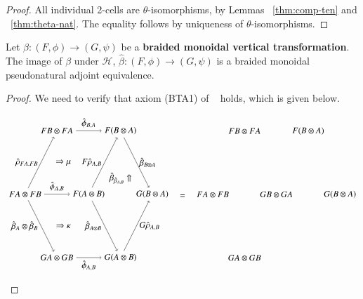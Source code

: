 \begin{proof}
All individual 2-cells are $\theta$-isomorphisms, by Lemmas ~\ref{thm:comp-ten} and ~\ref{thm:theta-nat}. The equality follows by uniqueness of $\theta$-isomorphisms.
\end{proof}

\begin{lem}\label{lem:brtran}
Let $\beta: (F, \phi) \rightarrow (G,\psi)$ be a {\bf braided monoidal vertical transformation}. The image of $\beta$ under $\mathcal{H}$, $\hat{\beta}: (F, \phi) \rightarrow (G,\psi)$ is a braided monoidal pseudonatural adjoint equivalence.
\end{lem}

\begin{proof}
We need to verify that axiom (BTA1) of ~\cite{mccrudden:bal-coalgb} holds, which is given below.

\begin{equation}
\begin{aligned}
\begin{tikzpicture}[scale=1.3]
\node (tl) at (1,4) {$FB \otimes FA$};
\node (tr) at (3,4) {$F(B \otimes A)$};
\node (ml) at (0,2) {$FA \otimes FB$};
\node (mm) at (2,2) {$F(A \otimes B)$};
\node (mr) at (4,2) {$G(B \otimes A)$};
\node (bl) at (1,0) {$GA \otimes GB$};
\node (br) at (3,0) {$G(A \otimes B)$};
\draw[->] (tl) to node [above] {$\hat{\phi}_{B,A}$} (tr);
\draw[->] (ml) to node [left] {$\hat{\rho}_{FA,FB}$} (tl);
\draw[->] (ml) to node [above] {$\hat{\phi}_{A,B}$} (mm);
\draw[->] (mm) to node [left] {$F\hat{\rho}_{A,B}$} (tr);
\draw[->] (tr) to node [right] {$\hat{\beta}_{B\otimes A}$} (mr);
\draw[->] (mm) to node [left] {$\hat{\beta}_{A\otimes B}$} (br);
\draw[->] (br) to node [right] {$G\hat{\rho}_{A,B}$} (mr);
\draw[->] (bl) to node [below] {$\hat{\phi}_{A,B}$} (br);
\draw[->] (ml) to node [left] {$\hat{\beta}_A \otimes \hat{\beta}_B$} (bl);
\node at (1.2,3) {$\Rightarrow \mu$};
\node at (1.2,1) {$\Rightarrow \kappa$};
\node at (3,2.5) {$\hat{\beta}_{\hat{\beta}_{A,B}}\Uparrow$};
\end{tikzpicture}
\end{aligned}
\hspace{0.25cm}
=
\hspace{0.25cm}
\begin{aligned}
\begin{tikzpicture}[scale=1.3]
\node (tl) at (1,4) {$FB \otimes FA$};
\node (tr) at (3,4) {$F(B \otimes A)$};
\node (ml) at (0,2) {$FA \otimes FB$};
\node (mm) at (2,2) {$GB \otimes GA$};
\node (mr) at (4,2) {$G(B \otimes A)$};
\node (bl) at (1,0) {$GA \otimes GB$};

\end{tikzpicture}
\end{aligned}
\end{equation}
\end{proof}
